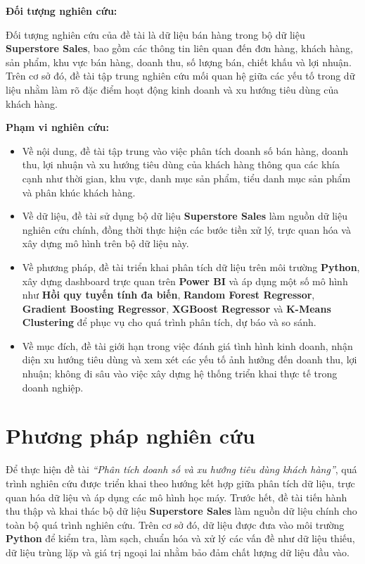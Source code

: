 \textbf{Đối tượng nghiên cứu:}

Đối tượng nghiên cứu của đề tài là dữ liệu bán hàng trong bộ dữ liệu \textbf{Superstore Sales}, bao gồm các thông tin liên quan đến đơn hàng, khách hàng, sản phẩm, khu vực bán hàng, doanh thu, số lượng bán, chiết khấu và lợi nhuận. Trên cơ sở đó, đề tài tập trung nghiên cứu mối quan hệ giữa các yếu tố trong dữ liệu nhằm làm rõ đặc điểm hoạt động kinh doanh và xu hướng tiêu dùng của khách hàng.

\textbf{Phạm vi nghiên cứu:}

\begin{itemize}
    \item Về nội dung, đề tài tập trung vào việc phân tích doanh số bán hàng, doanh thu, lợi nhuận và xu hướng tiêu dùng của khách hàng thông qua các khía cạnh như thời gian, khu vực, danh mục sản phẩm, tiểu danh mục sản phẩm và phân khúc khách hàng.
    
    \item Về dữ liệu, đề tài sử dụng bộ dữ liệu \textbf{Superstore Sales} làm nguồn dữ liệu nghiên cứu chính, đồng thời thực hiện các bước tiền xử lý, trực quan hóa và xây dựng mô hình trên bộ dữ liệu này.
    
    \item Về phương pháp, đề tài triển khai phân tích dữ liệu trên môi trường \textbf{Python}, xây dựng dashboard trực quan trên \textbf{Power BI} và áp dụng một số mô hình như \textbf{Hồi quy tuyến tính đa biến}, \textbf{Random Forest Regressor}, \textbf{Gradient Boosting Regressor}, \textbf{XGBoost Regressor} và \textbf{K-Means Clustering} để phục vụ cho quá trình phân tích, dự báo và so sánh.
    
    \item Về mục đích, đề tài giới hạn trong việc đánh giá tình hình kinh doanh, nhận diện xu hướng tiêu dùng và xem xét các yếu tố ảnh hưởng đến doanh thu, lợi nhuận; không đi sâu vào việc xây dựng hệ thống triển khai thực tế trong doanh nghiệp.
\end{itemize}


\section{Phương pháp nghiên cứu}

Để thực hiện đề tài \textit{``Phân tích doanh số và xu hướng tiêu dùng khách hàng''}, quá trình nghiên cứu được triển khai theo hướng kết hợp giữa phân tích dữ liệu, trực quan hóa dữ liệu và áp dụng các mô hình học máy. Trước hết, đề tài tiến hành thu thập và khai thác bộ dữ liệu \textbf{Superstore Sales} làm nguồn dữ liệu chính cho toàn bộ quá trình nghiên cứu. Trên cơ sở đó, dữ liệu được đưa vào môi trường \textbf{Python} để kiểm tra, làm sạch, chuẩn hóa và xử lý các vấn đề như dữ liệu thiếu, dữ liệu trùng lặp và giá trị ngoại lai nhằm bảo đảm chất lượng dữ liệu đầu vào.

